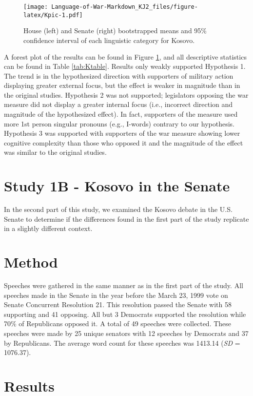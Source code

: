 \documentclass[jou,a4paper]{apa6}
\begin{document}
\begin{figure}
\centering
\texttt{[image: Language-of-War-Markdown\_KJ2\_files/figure-latex/Kpic-1.pdf]}
\caption{\label{fig:Kpic}House (left) and Senate (right) bootstrapped means and 95\% confidence interval of each linguistic category for Kosovo.}
\end{figure}

A forest plot of the results can be found in Figure \ref{fig:Kpic}, and all descriptive statistics can be found in Table \ref{tab:Ktable}. Results only weakly supported Hypothesis 1. The trend is in the hypothesized direction with supporters of military action displaying greater external focus, but the effect is weaker in magnitude than in the original studies. Hypothesis 2 was not supported; legislators opposing the war measure did not display a greater internal focus (i.e., incorrect direction and magnitude of the hypothesized effect). In fact, supporters of the measure used more 1st person singular pronouns (e.g., I-words) contrary to our hypothesis. Hypothesis 3 was supported with supporters of the war measure showing lower cognitive complexity than those who opposed it and the magnitude of the effect was similar to the original studies.

\section{Study 1B - Kosovo in the Senate}

In the second part of this study, we examined the Kosovo debate in the U.S. Senate to determine if the differences found in the first part of the study replicate in a slightly different context.

\section{Method}

Speeches were gathered in the same manner as in the first part of the study. All speeches made in the Senate in the year before the March 23, 1999 vote on Senate Concurrent Resolution 21. This resolution passed the Senate with 58 supporting and 41 opposing. All but 3 Democrats supported the resolution while 70\% of Republicans opposed it. A total of 49 speeches were collected. These speeches were made by 25 unique senators with 12 speeches by Democrats and 37 by Republicans. The average word count for these speeches was 1413.14 (\emph{SD} = 1076.37).

\section{Results}
\end{document}
